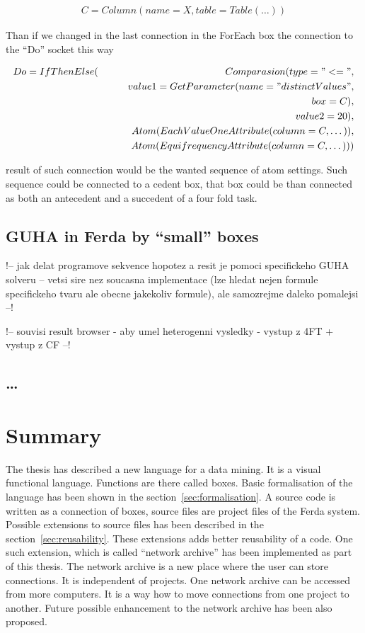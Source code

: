 \documentclass[a4paper,12pt]{book}
\begin{document}
\begin{eqnarray*}
C=Column(name=X, table=Table(\dots))
\end{eqnarray*}

Than if we changed in the last connection in the ForEach box the connection to the ``Do'' socket this way

\begin{eqnarray*}
Do=IfThenElse(&&Comparasion(type="<=", \\&&\qquad value1=GetParameter(name="distinctValues", \\&&\qquad\qquad box=C), \\&&\qquad value2=20),\\&&Atom(EachValueOneAttribute(column=C,\dots)),\\&&Atom(EquifrequencyAttribute(column=C,\dots)))
\end{eqnarray*}

result of such connection would be the wanted sequence of atom settings. Such sequence could be connected to a cedent box, that box could be than connected as both an antecedent and a succedent of a four fold task.

\section{GUHA in Ferda by ``small'' boxes}
!-- jak delat programove sekvence hopotez a resit je pomoci specifickeho GUHA solveru -- vetsi sire nez soucasna implementace (lze hledat nejen formule specifickeho tvaru ale obecne jakekoliv formule), ale samozrejme daleko pomalejsi --!

!-- souvisi result browser - aby umel heterogenni vysledky - vystup z 4FT + vystup z CF --!

\section{\dots}
\chapter{Summary}
The thesis has described a new language for a data mining. It is a visual functional language. Functions are there called boxes. Basic formalisation of the language has been shown in the section~\ref{sec:formalisation}. A source code is written as a connection of boxes, source files are project files of the Ferda system. Possible extensions to source files has been described in the section~\ref{sec:reusability}. These extensions adds better reusability of a code. One such extension, which is called ``network archive'' has been implemented as part of this thesis. The network archive is a new place where the user can store connections. It is independent of projects. One network archive can be accessed from more computers. It is a way how to move connections from one project to another. Future possible enhancement to the network archive has been also proposed.
\end{document}
